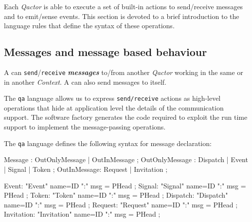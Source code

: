 


Each \textit{Qactor} is able to execute a set of built-in actions to send/receive messages and to emit/sense events. This section is devoted to a brief introduction to the language rules that define the syntax of these operations.
 



\subsection{Messages and message based behaviour} 
A \qa{} can \texttt{send}/\texttt{receive} \textit{\textbf{messages}} to/from another \textit{Qactor} working in the same or in another \textit{Context}. A \qa{} can also send messages to itself.

The \texttt{qa} language allows us to express \texttt{send/receive} actions as high-level operations that hide at application level the details of the communication support. The \qa{} software factory generates the code required to exploit the \qa{} run time support to implement the message-passing operations. 

The \texttt{qa} language defines the following syntax for message declaration: 

\begin{javacode}
Message :     	    OutOnlyMessage | OutInMessage  ;
OutOnlyMessage : 	Dispatch |  Event | Signal | Token ; 
OutInMessage: 		Request  | Invitation ;

Event: 		"Event"      name=ID  ":" msg = PHead  ;
Signal: 	"Signal"     name=ID  ":" msg = PHead  ;
Token:		"Token"      name=ID  ":" msg = PHead  ;
Dispatch: 	"Dispatch"   name=ID  ":" msg = PHead  ;
Request: 	"Request"    name=ID  ":" msg = PHead  ;
Invitation:	"Invitation" name=ID  ":" msg = PHead  ;
\end{javacode}
 
